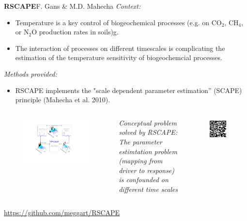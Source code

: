 
{\textbf{RSCAPE}\hfill\normalsize{F. Gans \& M.D. Mahecha}}
\alert{\textit{Context:}}
\begin{itemize}
	\item Temperature is a key control of biogeochemical processes (e.g. on CO$_2$, CH$_4$, or N$_2$O production rates in soils)g.
	\item The interaction of processes on different timescales is complicating the estimation of the temperature sensitivity of biogeochemcial processes.
\end{itemize}
 
\alert{\textit{Methods provided:}}
\begin{itemize}
	\item RSCAPE implements the "scale dependent parameter estimation” (SCAPE) principle (Mahecha et al. 2010).
\end{itemize}
\vspace{1cm}
\begin{columns}
	\begin{figure}[tb]
	\begin{center}
		\includegraphics[width=.95\textwidth]{images/content/FIG1.pdf}
	\end{center}
	\end{figure}
\small{\textit{Conceptual problem solved by RSCAPE: The parameter estimtation problem (mapping from driver to response) is confounded on different time scales}}
\vspace{4cm}
	\begin{figure}[tb]
		\includegraphics[width=.6\textwidth]{images/qrcode-RSCAPE.jpg}
	\end{figure}
\end{columns}
\vspace{1cm}
\hfill\large{\url{https://github.com/meggart/RSCAPE}}
